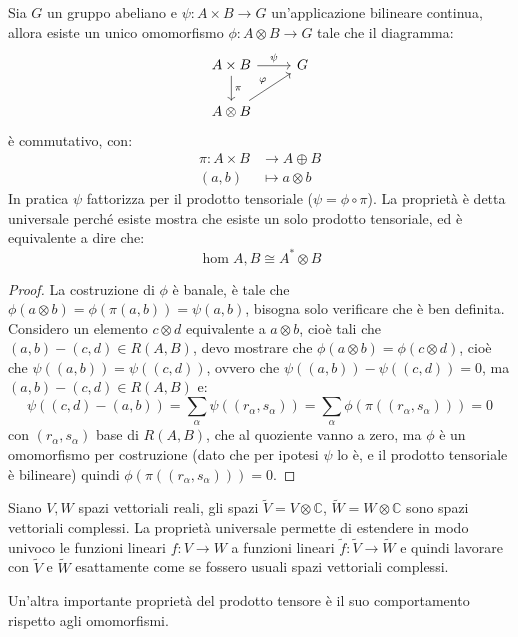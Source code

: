 \begin{proposition}
  Sia $ G $ un gruppo abeliano e $ \psi \colon A \times B \to G $ un'applicazione bilineare continua,
  allora esiste un unico omomorfismo $ \phi \colon A \otimes B \to G $ tale che il diagramma:
  \[
    \begin{tikzcd}
      A \times B \rar{\psi} \dar{\pi} & G \\
      A \otimes B \arrow{ru}{\phi} & {}
    \end{tikzcd}
  \]
  è commutativo, con:
  \begin{align*}
    \pi \colon A \times B & \to A \oplus B \\
    (a,b) & \mapsto a \otimes b
  \end{align*}
  In pratica $ \psi $ fattorizza per il prodotto tensoriale
  ($ \psi = \phi \circ \pi $). La proprietà è detta universale perché esiste mostra che
  esiste un solo prodotto tensoriale, ed è equivalente a dire
  che:
  \[
    \hom{A,B} \cong A^* \otimes B
  \]
\end{proposition}
\begin{proof}
  La costruzione di $ \phi $ è banale, è tale che $ \phi(a \otimes b) = \phi(\pi(a,b)) = \psi(a,b) $,
  bisogna solo verificare che è ben definita.
  Considero un elemento $ c \otimes d $ equivalente a $ a \otimes b $, cioè tali
  che $ (a,b) - (c,d) \in R(A,B) $, devo mostrare che $ \phi(a \otimes b) = \phi(c \otimes d) $,
  cioè che $ \psi((a,b)) = \psi((c,d)) $, ovvero che $ \psi((a,b)) - \psi((c,d)) = 0 $, ma
  $ (a,b) - (c,d) \in R(A,B) $ e:
  \[
    \psi((c,d) - (a,b)) = \sum_\alpha \psi((r_\alpha, s_\alpha)) = \sum_\alpha \phi \left(\pi((r_\alpha, s_\alpha))\right) = 0
  \]
  con $ (r_\alpha,s_\alpha) $ base di $ R(A,B) $, che al quoziente vanno a zero, ma
  $ \phi $ è un omomorfismo per costruzione (dato che per ipotesi $ \psi $ lo è, e il
  prodotto tensoriale è bilineare) quindi $ \phi(\pi((r_\alpha, s_\alpha))) = 0 $.
\end{proof}
\begin{example}
  Siano $ V, W $ spazi vettoriali reali, gli spazi
  $ \tilde{V} = V \otimes \mathbb{C} $, $ \tilde{W} = W \otimes \mathbb{C} $ sono spazi
  vettoriali complessi. La proprietà universale permette di estendere in modo
  univoco le funzioni lineari $ f \colon V \to W $ a funzioni lineari
  $ \tilde{f} : \tilde{V} \to \tilde{W} $ e quindi lavorare con $ \tilde{V} $ e
  $ \tilde{W} $ esattamente come se fossero usuali spazi vettoriali complessi.
\end{example}
Un'altra importante proprietà del prodotto tensore è il suo comportamento
rispetto agli omomorfismi.

